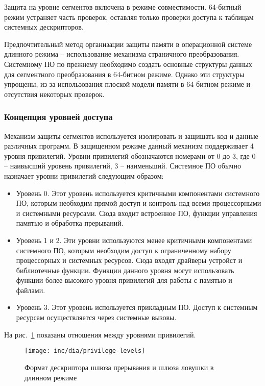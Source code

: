 Защита на уровне сегментов включена в режиме совместимости. 64-битный режим устраняет часть проверок,
оставляя только проверки доступа к таблицам системных дескрипторов.

Предпочтительный метод организации защиты памяти в операционной системе длинного режима -- использование
механизма страничного преобразования. Системному ПО по прежнему необходимо создать основные структуры
данных для сегментного преобразования в 64-битном режиме. Однако эти структуры упрощены, из-за использования
плоской модели памяти в 64-битном режиме и отсутствия некоторых проверок.

\subsubsection*{Концепция уровней доступа}
Механизм защиты сегментов используется изолировать и защищать код и данные различных программ. В защищенном
режиме данный механизм поддерживает 4 уровня привилегий. Уровни привилегий обозначаются номерами от 0 до 3,
где 0 -- наивысший уровень привилегий, 3 -- наименьший. Системное ПО обычно назначает уровни привилегий
следующим образом:
\begin{itemize}
\item Уровень 0. Этот уровень используется критичными компонентами системного ПО, которым
	необходим прямой доступ и контроль над всеми процессорными и системными ресурсами.
	Сюда входит встроенное ПО, функции управления памятью и обработка прерываний.
\item Уровень 1 и 2. Эти уровни используются менее критичными компонентами системного ПО,
	которым необходим доступ к ограниченному набору процессорных и системных ресурсов.
	Сюда входят драйверы устройст и библиотечные функции. Функции данного уровня могут
	использовать функции более высокого уровня привилегий для работы с памятью и файлами.
\item Уровень 3. Этот уровень используется прикладным ПО. Доступ к системным ресурсам осуществляется
	через системные вызовы.
\end{itemize}

На рис.~\ref{fig:privilege-levels} показаны отношения между уровнями привилегий.

\begin{figure}[ht]
  \centering
  \texttt{[image: inc/dia/privilege-levels]}
  \caption{Формат дескриптора шлюза прерывания и шлюза ловушки в длинном режиме}
  \label{fig:privilege-levels}
\end{figure}

